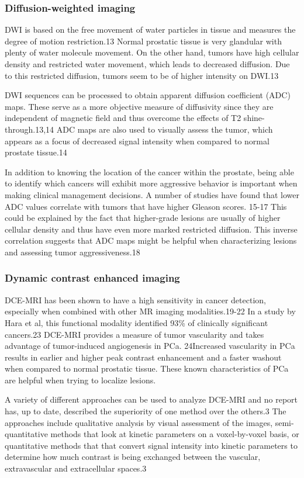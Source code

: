 \subsubsection{Diffusion-weighted imaging}
 DWI is based on the free movement of water particles in tissue and measures the degree of motion restriction.13 Normal prostatic tissue is very glandular with plenty of water molecule movement. On the other hand, tumors have high cellular density and restricted water movement, which leads to decreased diffusion. Due to this restricted diffusion, tumors seem to be of higher intensity on DWI.13

 DWI sequences can be processed to obtain apparent diffusion coefficient (ADC) maps. These serve as a more objective measure of diffusivity since they are independent of magnetic field and thus overcome the effects of T2 shine-through.13,14  ADC maps are also used to visually assess the tumor, which appears as a focus of decreased signal intensity when compared to normal prostate tissue.14 

 In addition to knowing the location of the cancer within the prostate, being able to identify which cancers will exhibit more aggressive behavior is important when making clinical management decisions. A number of studies have found that lower ADC values correlate with tumors that have higher Gleason scores. 15-17 This could be explained by the fact that higher-grade lesions are usually of higher cellular density and thus have even more marked restricted diffusion. This inverse correlation suggests that ADC maps might be helpful when characterizing lesions and assessing tumor aggressiveness.18 

\subsubsection{Dynamic contrast enhanced imaging}
 DCE-MRI has been shown to have a high sensitivity in cancer detection, especially when combined with other MR imaging modalities.19-22 In a study by Hara et al, this functional modality identified 93\% of clinically significant cancers.23 DCE-MRI provides a measure of tumor vascularity and takes advantage of tumor-induced angiogenesis in PCa. 24Increased vascularity in PCa results in earlier and higher peak contrast enhancement and a faster washout when compared to normal prostatic tissue. These known characteristics of PCa are helpful when trying to localize lesions. 

 A variety of different approaches can be used to analyze DCE-MRI and no report has, up to date, described the superiority of one method over the others.3 The approaches include qualitative analysis by visual assessment of the images, semi-quantitative methods that look at kinetic parameters on a voxel-by-voxel basis, or quantitative methods that that convert signal intensity into kinetic parameters to determine how much contrast is being exchanged between the vascular, extravascular and extracellular spaces.3
    
